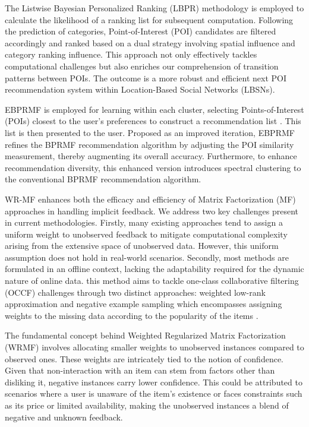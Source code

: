 \documentclass[journal]{IEEEtran}
\begin{document}
The Listwise Bayesian Personalized Ranking (LBPR) \cite{He20171837} methodology is employed to calculate the likelihood of a ranking list for 
subsequent computation. Following the prediction of categories, Point-of-Interest (POI) candidates are filtered accordingly and 
ranked based on a dual strategy involving spatial influence and category ranking influence. This approach not only effectively 
tackles computational challenges but also enriches our comprehension of transition patterns between POIs. The outcome is a more 
robust and efficient next POI recommendation system within Location-Based Social Networks (LBSNs).

EBPRMF is employed for learning within each cluster, selecting Points-of-Interest (POIs) closest to the user's preferences to 
construct a recommendation list \cite{9296759}. This list is then presented to the user. Proposed as an improved iteration, EBPRMF refines 
the BPRMF recommendation algorithm by adjusting the POI similarity measurement, thereby augmenting its overall accuracy. 
Furthermore, to enhance recommendation diversity, this enhanced version introduces spectral clustering to the conventional 
BPRMF recommendation algorithm.

WR-MF \cite{he2017fast} enhances both the efficacy and efficiency of Matrix Factorization (MF) approaches in handling implicit feedback. We address two key 
challenges present in current methodologies. Firstly, many existing approaches tend to assign a uniform weight to unobserved 
feedback to mitigate computational complexity arising from the extensive space of unobserved data. However, this uniform 
assumption does not hold in real-world scenarios. Secondly, most methods are formulated in an offline context, lacking the 
adaptability required for the dynamic nature of online data. this method aims to tackle one-class collaborative filtering (OCCF) 
challenges through two distinct approaches: weighted low-rank approximation and negative example sampling which encompasses
assigning weights to the missing data according to the popularity of the items \cite{he2017fast}.

The fundamental concept behind Weighted Regularized Matrix Factorization (WRMF) involves allocating smaller weights to unobserved 
instances compared to observed ones. These weights are intricately tied to the notion of confidence. Given that non-interaction with 
an item can stem from factors other than disliking it, negative instances carry lower confidence. This could be attributed to 
scenarios where a user is unaware of the item's existence or faces constraints such as its price or limited availability, 
making the unobserved instances a blend of negative and unknown feedback.
\end{document}
